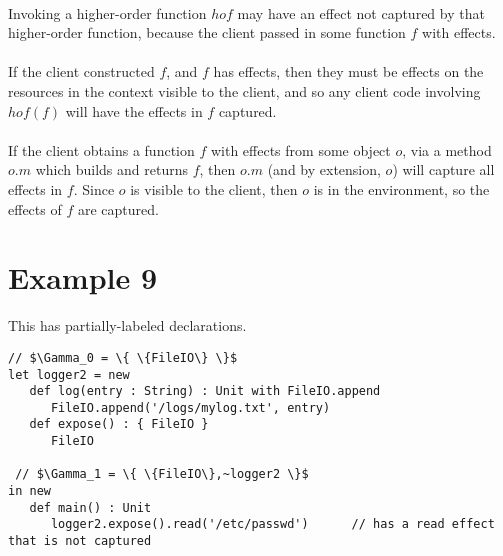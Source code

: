 \documentclass{llncs}
\begin{document}
\paragraph{}
Invoking a higher-order function $hof$ may have an effect not captured by that higher-order function, because the client passed in some function $f$ with effects.

\paragraph{}
If the client constructed $f$, and $f$ has effects, then they must be effects on the resources in the context visible to the client, and so any client code involving $hof(f)$ will have the effects in $f$ captured.

\paragraph{}
If the client obtains a function $f$ with effects from some object $o$, via a method $o.m$ which builds and returns $f$, then $o.m$ (and by extension, $o$) will capture all effects in $f$. Since $o$ is visible to the client, then $o$ is in the environment, so the effects of $f$ are captured.

\section{Example 9}

This has partially-labeled declarations.

\vspace{-6pt}
\begin{lstlisting}[xleftmargin=20pt]
// $\Gamma_0 = \{ \{FileIO\} \}$
let logger2 = new
   def log(entry : String) : Unit with FileIO.append
      FileIO.append('/logs/mylog.txt', entry)
   def expose() : { FileIO }
      FileIO
      
 // $\Gamma_1 = \{ \{FileIO\},~logger2 \}$
in new
   def main() : Unit
      logger2.expose().read('/etc/passwd')		// has a read effect that is not captured
\end{lstlisting}
\end{document}
